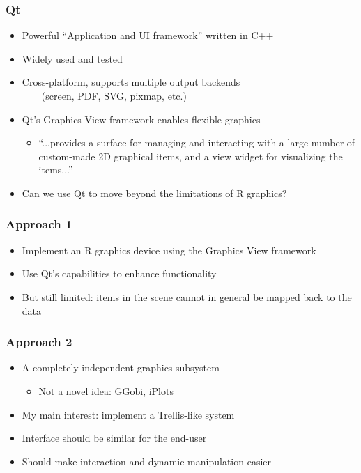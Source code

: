 \documentclass[compress]{beamer}
\begin{document}
\begin{frame}
  \frametitle{Qt}
  \begin{itemize}
  \item Powerful ``Application and UI framework'' written in C++
  \item Widely used and tested
  \item Cross-platform, supports multiple output backends \\
    ~~~~(screen, PDF, SVG, pixmap, etc.)
  \item Qt's Graphics View framework enables flexible graphics
    \begin{itemize}
    \item[] ``...provides a surface for managing and interacting with
      a large number of custom-made 2D graphical items, and a view
      widget for visualizing the items...''
    \end{itemize}
  \item<2>{Can we use Qt to move beyond the limitations of R graphics?} 
  \end{itemize}
\end{frame}

\begin{frame}
  \frametitle{Approach 1}
  \begin{itemize}
  \item Implement an R graphics device using the Graphics View framework
  \item Use Qt's capabilities to enhance functionality
  \item But still limited: items in the scene cannot in general be mapped back to the data
  \end{itemize}
\end{frame}

\begin{frame}
  \frametitle{Approach 2}
  \begin{itemize}
  \item A completely independent graphics subsystem 
    \begin{itemize}
    \item Not a novel idea: GGobi, iPlots
    \end{itemize} 
    \item My main interest: implement a Trellis-like system
    \item Interface should be similar for the end-user 
    \item Should make interaction and dynamic manipulation easier
 \end{itemize}
\end{frame}
\end{document}

